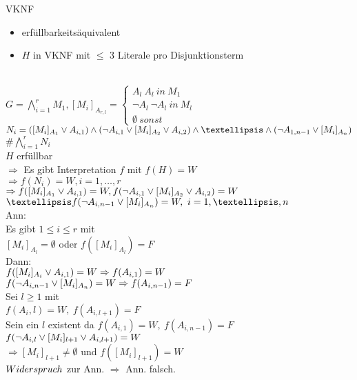 

 VKNF
\begin{itemize}
\item erfüllbarkeitsäquivalent
\item $H$ in VKNF mit $\leq$ 3 Literale pro Disjunktionsterm
\end{itemize}


\beweis{}\\
$G = \bigwedge_{i=1}^r M_1, [M_i]_{A_{r,l}} = \begin{cases} A_l\ A_l\ in\ M_1 \\ \neg A_l\ \neg A_l\ in\ M_l \\ \emptyset\ sonst \end{cases}$\\

$N_i = ( [M_i]_{A_1} \OR A_{i,1}) \AND ( \neg A_{i,1} \OR [M_i]_{A_2} \OR A_{i,2}) \AND … \AND ( \neg A_{1,n-1} \OR [M_i]_{A_n})$\\
$\# \bigwedge_{i=1}^r N_i$\\

$H$ erfüllbar\\
$\Rightarrow$ Es gibt Interpretation $f$ mit $f(H) = W$\\
$\Rightarrow f(N_i) = W, i=1, …, r$\\
$\Rightarrow f([M_i]_{A_1} \vee A_{i,1}) = W, f(\neg A_{i,1} \vee [M_i]_{A_2} \vee A_{i,2}) = W$\\
$… f(\neg A_{i,n-1} \OR [M_i]_{A_n}) = W,\ i=1, …, n$\\

Ann:\\
Es gibt $1 \leq i \leq r$ mit \\
$[M_i]_{A_l} = \emptyset$ oder $f([M_i]_{A_l}) = F$\\
Dann:\\
$f([M_i]_{A_i} \vee A_{i,1}) = W \Rightarrow f(A_{i,1}) = W$\\
$f(\neg A_{i,n-1} \vee [M_i]_{A_n} )=W \Rightarrow f(A_{i,n-1})=F$\\

Sei $l \geq 1$ mit\\
$f(A_i,l) = W,\ f(A_{i,l+1}) = F$\\
Sein ein $l$ existent da $f(A_{i,1}) = W,\ f(A_{i,n-1}) = F$\\
$f(\neg A_{i,l} \vee [M_i]_{l+1} \vee A_{i,l+1})=W$\\
$\Rightarrow [M_i]_{l+1} \neq \emptyset$ und $f([M_i]_{l+1}) = W$\\
$Widerspruch$ zur Ann. $\Rightarrow$ Ann. falsch.\\

